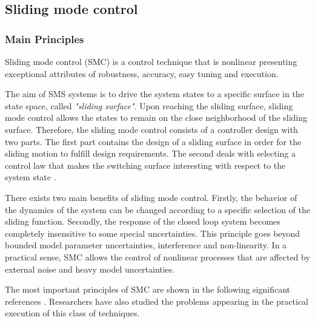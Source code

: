 \documentclass{thesisreport}
\begin{document}





 \subsection{Sliding mode control}
 
 
 
  \subsubsection{Main Principles}
 
 
 
Sliding mode control (SMC) is a control technique that is nonlinear presenting exceptional attributes of robustness,
accuracy, easy tuning and execution.
 
The aim of SMS systems is to drive the system states to a specific surface in the state space, called  \textit{"sliding surface"}. Upon reaching the sliding surface, sliding mode control allows the states to remain on the close neighborhood of the sliding surface. Therefore, the sliding mode control consists of a controller design with two parts. The first part contains the design of a sliding surface in order for the sliding motion to fulfill design requirements. The second deals with selecting a control law that makes the switching surface interesting with respect to the system state \cite{Utkin1997}.

There exists two main benefits of sliding mode control. Firstly, the behavior of the dynamics of the system can be changed according to a specific selection of the sliding function. Secondly, the response of the closed loop system becomes completely insensitive to some special uncertainties. This principle goes beyond bounded model parameter uncertainties, interference and non-linearity. In a practical sense, SMC allows the control of nonlinear processes that are affected by external noise and heavy model uncertainties.

The most important principles of SMC are shown in the following significant references \cite{Utkin1997,DeCarlo1998,Hung1993}. Researchers have also studied the problems appearing in the practical execution of this class of techniques. \cite{Young1999}
\end{document}
